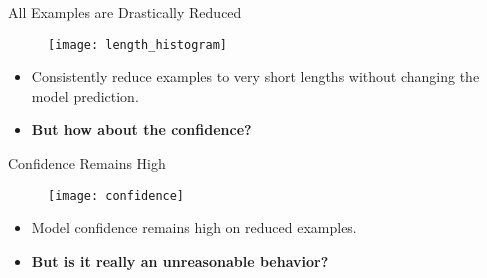 \begin{frame}{All Examples are Drastically Reduced}
\begin{figure}
\centering
\texttt{[image: length\_histogram]}
\end{figure}
\begin{itemize}
\item Consistently reduce examples to very short lengths without changing the model prediction. \pause
\item \textbf{But how about the confidence?}
\end{itemize}
\end{frame}

\begin{frame}{Confidence Remains High}
\begin{figure}
\centering
\texttt{[image: confidence]}
\end{figure}
\begin{itemize}
\item Model confidence remains high on reduced examples. \pause
\item \textbf{But is it really an unreasonable behavior?}
\end{itemize}
\end{frame}

